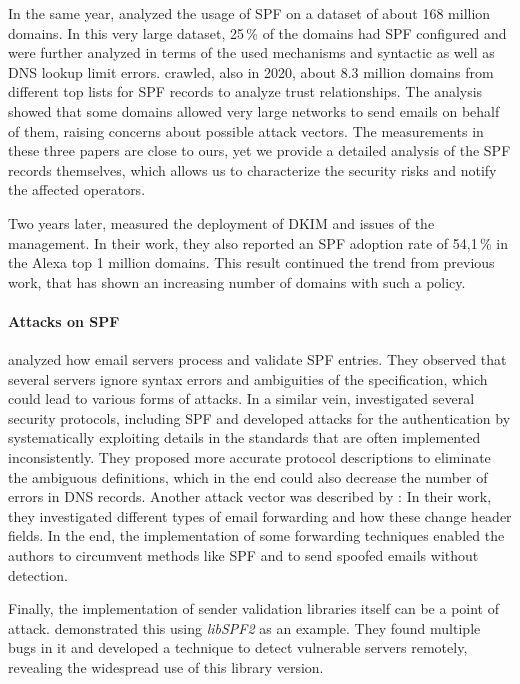 In the same year, \mbox{\citet{Kahraman2020}} analyzed the usage of \ac{SPF} on a dataset of about 168 million domains. In this very large dataset, 25\,\% of the domains had \ac{SPF} configured and were further analyzed in terms of the used mechanisms and syntactic as well as DNS lookup limit errors.
\citet{Trost2020} crawled, also in 2020, about 8.3 million domains from different top lists for SPF records to analyze trust relationships.
The analysis showed that some domains allowed very large networks to send emails on behalf of them, raising concerns about possible attack vectors.
The measurements in these three papers are close to ours, yet we provide a detailed analysis of the \ac{SPF} records themselves, which allows us to characterize the security risks and notify the affected operators.

Two years later, \citet{Wang2022} measured the deployment of \ac{DKIM} and issues of the management.
In their work, they also reported an \ac{SPF} adoption rate of 54,1\,\% in the Alexa top 1 million domains.
This result continued the trend from previous work, that has shown an increasing number of domains with such a policy.



\paragraph{Attacks on SPF}
\citet{Deccio2021} analyzed how email servers process and validate \ac{SPF} entries. They observed that several servers ignore syntax errors and ambiguities of the specification, which could lead to various forms of attacks.
In a similar vein, \citet{Shen2021} investigated several security protocols, including SPF and developed attacks for the authentication by systematically exploiting details in the standards that are often implemented inconsistently.
They proposed more accurate protocol descriptions to eliminate the ambiguous definitions, which in the end could also decrease the number of errors in DNS records.
Another attack vector was described by \citet{Liu2023}:
In their work, they investigated different types of email forwarding and how these change header fields.
In the end, the implementation of some forwarding techniques enabled the authors to circumvent methods like \ac{SPF} and to send spoofed emails without detection.

Finally, the implementation of sender validation libraries itself can be a point of attack.
\citet{Bennett2022} demonstrated this using \textit{libSPF2} as an example.
They found multiple bugs in it and developed a technique to detect vulnerable servers remotely, revealing the widespread use of this library version.

